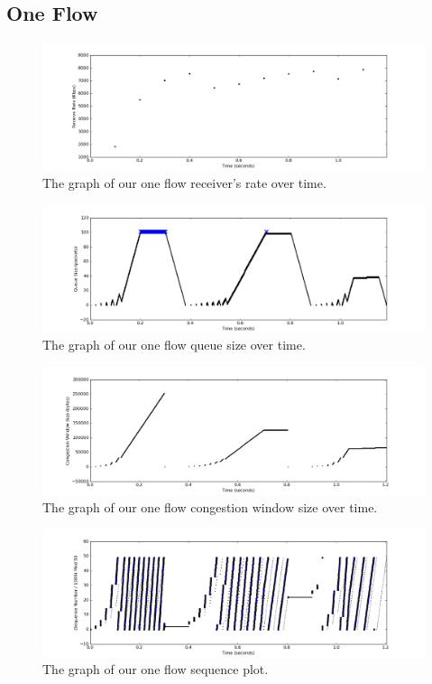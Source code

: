 \documentclass[11pt]{article}
\begin{document}
\subsection{One Flow}
  
\begin{figure}[H]
\caption{The graph of our one flow receiver's rate over time.}
	\label{figure1}
  	\centering
  	\includegraphics[width=\linewidth]{1f_rate.png}
\end{figure}

\begin{figure}[H]
\caption{The graph of our one flow queue size over time.}
  \label{figure2}
    \centering
    \includegraphics[width=\linewidth]{1f_queue.png}
\end{figure}

\begin{figure}[H]
\caption{The graph of our one flow congestion window size over time.}
  \label{figure3}
    \centering
    \includegraphics[width=\linewidth]{1f_window.png}
\end{figure}

\begin{figure}[H]
\caption{The graph of our one flow sequence plot.}
  \label{figure4}
    \centering
    \includegraphics[width=\linewidth]{1f_seq.png}
\end{figure}
\end{document}
